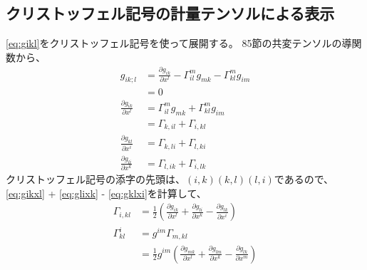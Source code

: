 \documentclass{jsarticle}
\begin{document}
\subsection{クリストッフェル記号の計量テンソルによる表示}
\eqref{eq:gikl}をクリストッフェル記号を使って展開する。
85節の共変テンソルの導関数から、
\begin{align}
    g_{ik;l} &= \frac{\partial{g_{ik}}}{\partial{x^{l}}} - 
    \Gamma^{m}_{il} g_{mk} - \Gamma^{m}_{kl}g_{im}\\
    &= 0\\
    \frac{\partial{g_{ik}}}{\partial{x^{l}}} &= 
    \Gamma^{m}_{il} g_{mk} + \Gamma^{m}_{kl}g_{im}\\
    &= \Gamma_{k,il} + \Gamma_{i,kl}
    \label{eq:gikxl}\\
    \frac{\partial{g_{kl}}}{\partial{x^{i}}} 
    &= \Gamma_{k,li} + \Gamma_{l,ki}
    \label{eq:gklxi}\\
    \frac{\partial{g_{li}}}{\partial{x^{k}}} 
    &= \Gamma_{l,ik} + \Gamma_{i,lk}
    \label{eq:glixk}
\end{align}
クリストッフェル記号の添字の先頭は、$(i, k) (k, l) (l, i)$であるので、
\eqref{eq:gikxl} + \eqref{eq:glixk} - \eqref{eq:gklxi}を計算して、
\begin{align}
    \Gamma_{i,kl} &=
    \frac{1}{2}
    \left(
    \frac{\partial{g_{ik}}}{\partial{x^{l}}}
     +
    \frac{\partial{g_{li}}}{\partial{x^{k}}}
     -
    \frac{\partial{g_{lk}}}{\partial{x^{i}}}
    \right)
    \label{eq:gamma1}\\
    \Gamma^{i}_{kl} &= g^{im} \Gamma_{m,kl}\\
                    &=
    \frac{1}{2}g^{im} 
    \left(
    \frac{\partial{g_{mk}}}{\partial{x^{l}}}
     +
    \frac{\partial{g_{lm}}}{\partial{x^{k}}}
     -
    \frac{\partial{g_{lk}}}{\partial{x^{m}}}
    \right)
    \label{eq:gamma2}
\end{align}
\end{document}
